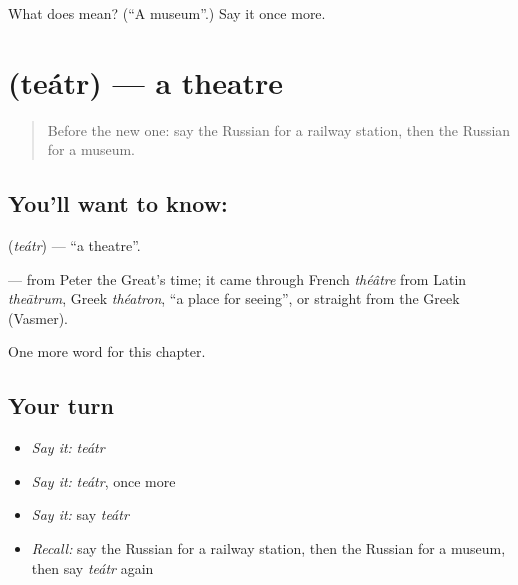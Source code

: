 \begin{tcolorbox}[breakable,colback=teal!4,colframe=teal!35!black,title={Before you move on}]
What does  mean? (\textquotedblleft{}A museum\textquotedblright{}.) Say it once more.
\end{tcolorbox}
\section[\texorpdfstring{\ru{театр} (teátr)}{театр (teátr)}]{ (teátr) — a theatre}

\label{lesson:RU-C78-theatre}



\begin{quote}
Before the new one: say the Russian for a railway station, then the Russian for a museum.
\end{quote}

\subsection*{You'll want to know: }
\textbf{} (\emph{teátr}) — \textquotedblleft{}a theatre\textquotedblright{}.

\begin{cousinweb}
\textbf{} — from Peter the Great's time; it came through French \emph{théâtre} from Latin \emph{theātrum}, Greek \emph{théatron}, \textquotedblleft{}a place for seeing\textquotedblright{}, or straight from the Greek (Vasmer).
\end{cousinweb}

\begin{grammarlens}[title={What you've built}]
One more word for this chapter.
\end{grammarlens}

\subsection*{Your turn}
\begin{itemize}
\raggedright
  \item \emph{Say it:} \emph{teátr}
  \item \emph{Say it:} \emph{teátr}, once more
  \item \emph{Say it:} say \emph{teátr}
  \item \emph{Recall:} say the Russian for a railway station, then the Russian for a museum, then say \emph{teátr} again
\end{itemize}

